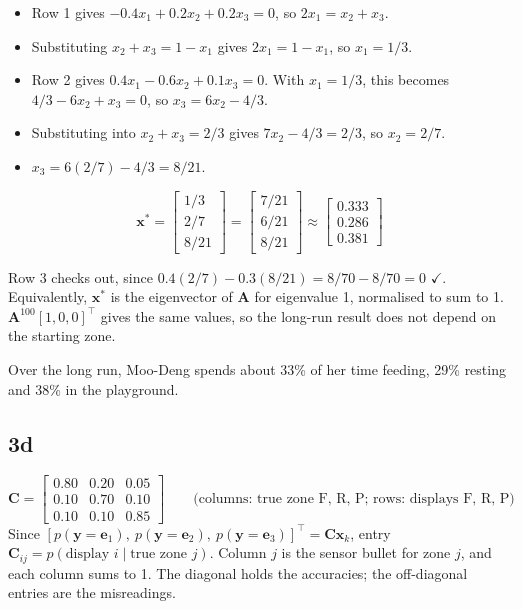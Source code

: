 \documentclass[11pt]{article}
\newcommand{\vect}[1]{\mathbf{#1}}
\newcommand{\mat}[1]{\mathbf{#1}}
\begin{document}
\begin{itemize}
    \item Row 1 gives $-0.4x_1 + 0.2x_2 + 0.2x_3 = 0$, so $2x_1 = x_2 + x_3$.
    \item Substituting $x_2 + x_3 = 1 - x_1$ gives $2x_1 = 1 - x_1$, so $x_1 = 1/3$.
    \item Row 2 gives $0.4x_1 - 0.6x_2 + 0.1x_3 = 0$. With $x_1 = 1/3$, this becomes $4/3 - 6x_2 + x_3 = 0$, so $x_3 = 6x_2 - 4/3$.
    \item Substituting into $x_2 + x_3 = 2/3$ gives $7x_2 - 4/3 = 2/3$, so $x_2 = 2/7$.
    \item $x_3 = 6(2/7) - 4/3 = 8/21$.
\end{itemize}
\begin{equation*}
    \vect{x}^* = \begin{bmatrix} 1/3 \\ 2/7 \\ 8/21 \end{bmatrix} = \begin{bmatrix} 7/21 \\ 6/21 \\ 8/21 \end{bmatrix} \approx \begin{bmatrix} 0.333 \\ 0.286 \\ 0.381 \end{bmatrix}
\end{equation*}

Row 3 checks out, since $0.4(2/7) - 0.3(8/21) = 8/70 - 8/70 = 0$ $\checkmark$. Equivalently, $\vect{x}^*$ is the eigenvector of $\mat{A}$ for eigenvalue 1, normalised to sum to 1. $\mat{A}^{100}[1, 0, 0]^\top$ gives the same values, so the long-run result does not depend on the starting zone.

Over the long run, Moo-Deng spends about 33\% of her time feeding, 29\% resting and 38\% in the playground.

\subsection*{3d}

\begin{equation*}
    \mat{C} = \begin{bmatrix} 0.80 & 0.20 & 0.05 \\ 0.10 & 0.70 & 0.10 \\ 0.10 & 0.10 & 0.85 \end{bmatrix}
    \qquad \text{(columns: true zone F, R, P; rows: displays F, R, P)}
\end{equation*}
Since $[p(\vect{y} = \vect{e}_1),\ p(\vect{y} = \vect{e}_2),\ p(\vect{y} = \vect{e}_3)]^\top = \mat{C}\vect{x}_k$, entry $\mat{C}_{ij} = p(\text{display } i \mid \text{true zone } j)$. Column $j$ is the sensor bullet for zone $j$, and each column sums to 1. The diagonal holds the accuracies; the off-diagonal entries are the misreadings.
\end{document}
